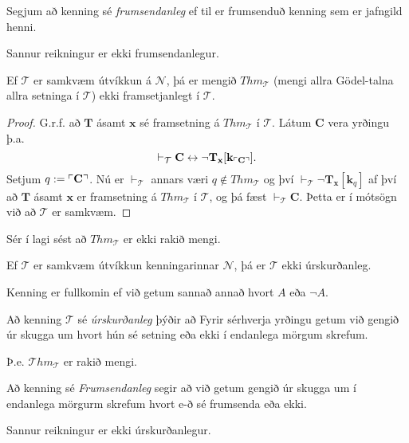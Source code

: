 \documentclass[12pt]{book}
\newcommand{\cT}{\mathcal{T}}
\newcommand{\cN}{\mathcal{N}}
\newcommand{\mc}[1]{\mathcal{#1}}
\newcommand{\bC}{\mathbf{C}}
\newcommand{\bT}{\mathbf{T}}
\newcommand{\bx}{\mathbf{x}}
\newcommand{\bk}{\mathbf{k}}
\newcommand{\Thm}{{\mc{T}hm}}
\newcommand{\vT}{\vdash_{\cT}}
\newcommand{\thT}{Thm_{\cT}}
\DeclarePairedDelimiter{\god}{\ulcorner}{\urcorner}
\begin{document}
\begin{skgr}
  Segjum að kenning sé \emph{frumsendanleg} ef til er frumsenduð kenning sem
  er jafngild henni.

\end{skgr}

\begin{setn}[Fylgisetning]
 Sannur reikningur er ekki frumsendanlegur. 
\end{setn}

\begin{setn}[Hjálparsetning]
Ef $\cT$ er samkvæm útvíkkun á $\cN$, þá er mengið $Thm_{\cT}$ (mengi allra Gödel-talna allra setninga í $\cT$)
ekki framsetjanlegt í $\cT$.
\end{setn}

\begin{proof}
  G.r.f. að $\bT$ ásamt $\bx$ sé framsetning á $Thm_{\cT}$ í $\cT$.
  Látum $\bC$ vera yrðingu þ.a.
  \[\vdash_{\cT} \bC \leftrightarrow \lnot \bT_{\bx}[\bk_{\god{\bC}}]. \]
  Setjum $q:= \god{\bC}$. Nú er $\vdash_{\cT}$ annars væri
  $q \not\in Thm_{\cT}$ og því $\vT \lnot \bT_{\bx}[\bk_q]$ af því að
  $\bT$ ásamt $\bx$ er framsetning á $\thT$ í $\cT$,
  og þá fæst $\vT \bC$. Þetta er í mótsögn við að
  $\cT$ er samkvæm.

\end{proof}
Sér í lagi sést að $\thT$ er ekki rakið mengi.

\begin{setn}[Church] Ef $\cT$ er samkvæm útvíkkun kenningarinnar $\cN$,
  þá er $\cT$ ekki úrskurðanleg.
\end{setn}
\begin{skgr}
  Kenning er fullkomin ef við getum sannað annað hvort
 $A$ eða $\lnot A$.
\end{skgr}

\begin{skgr}
  Að kenning $\cT$ sé \emph{úrskurðanleg} þýðir að
  Fyrir sérhverja yrðingu getum við gengið úr skugga um hvort
  hún sé setning eða ekki í endanlega mörgum skrefum.
  
  Þ.e. $\Thm_{\cT}$ er rakið mengi.

  Að kenning sé \emph{Frumsendanleg} segir að við getum gengið úr skugga um í endanlega
  mörgurm skrefum hvort e-ð sé frumsenda eða ekki.

\end{skgr}
\begin{setn}
  Sannur reikningur er ekki úrskurðanlegur.
\end{setn}
\end{document}
